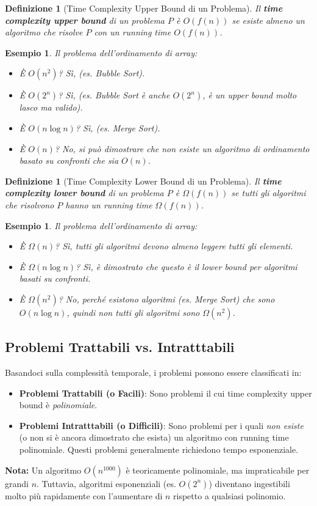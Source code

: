 \documentclass[a4paper, 11pt]{book} %
\newtheorem{definition}[theorem]{Definizione}
\newtheorem{example}[theorem]{Esempio}
\theoremstyle{definition}
\begin{document}
\begin{definition}[Time Complexity Upper Bound di un Problema]
Il \textbf{time complexity upper bound} di un problema $P$ è $O(f(n))$ se \emph{esiste almeno un algoritmo} che risolve $P$ con un running time $O(f(n))$.
\end{definition}
\begin{example}
Il problema dell'ordinamento di array:
\begin{itemize}
    \item È $O(n^2)$? Sì, (es. Bubble Sort).
    \item È $O(2^n)$? Sì, (es. Bubble Sort è anche $O(2^n)$, è un upper bound molto lasco ma valido).
    \item È $O(n \log n)$? Sì, (es. Merge Sort).
    \item È $O(n)$? No, si può dimostrare che non esiste un algoritmo di ordinamento basato su confronti che sia $O(n)$.
\end{itemize}
\end{example}

\begin{definition}[Time Complexity Lower Bound di un Problema]
Il \textbf{time complexity lower bound} di un problema $P$ è $\Omega(f(n))$ se \emph{tutti gli algoritmi} che risolvono $P$ hanno un running time $\Omega(f(n))$.
\end{definition}
\begin{example}
Il problema dell'ordinamento di array:
\begin{itemize}
    \item È $\Omega(n)$? Sì, tutti gli algoritmi devono almeno leggere tutti gli elementi.
    \item È $\Omega(n \log n)$? Sì, è dimostrato che questo è il lower bound per algoritmi basati su confronti.
    \item È $\Omega(n^2)$? No, perché esistono algoritmi (es. Merge Sort) che sono $O(n \log n)$, quindi non tutti gli algoritmi sono $\Omega(n^2)$.
\end{itemize}
\end{example}

\subsection{Problemi Trattabili vs. Intratttabili}
Basandoci sulla complessità temporale, i problemi possono essere classificati in:
\begin{itemize}
    \item \textbf{Problemi Trattabili (o Facili)}: Sono problemi il cui time complexity upper bound è \emph{polinomiale}.
    \item \textbf{Problemi Intratttabili (o Difficili)}: Sono problemi per i quali \emph{non esiste} (o non si è ancora dimostrato che esista) un algoritmo con running time polinomiale. Questi problemi generalmente richiedono tempo esponenziale.
\end{itemize}
\textbf{Nota:} Un algoritmo $O(n^{1000})$ è teoricamente polinomiale, ma impraticabile per grandi $n$. Tuttavia, algoritmi esponenziali (es. $O(2^n)$) diventano ingestibili molto più rapidamente con l'aumentare di $n$ rispetto a qualsiasi polinomio.
\end{document}
